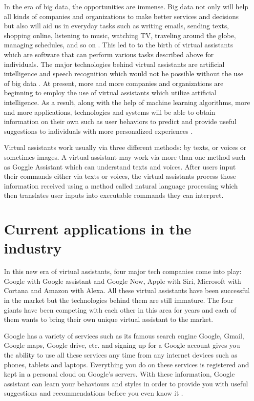 In the era of big data, the opportunities are immense. Big data not only will help all kinds of companies and organizations to make better services and decisions but also will aid us in everyday tasks such as writing emails, sending texts, shopping online, listening to music, watching TV, traveling around the globe, managing schedules, and so on \cite{Tal2015internet}. This led to to the birth of virtual assistants which are software that can perform various tasks described above for individuals. The major technologies behind virtual assistants are artificial intelligence and speech recognition which would not be possible without the use of big data \cite{Baron2017assistants}. At present, more and more companies and organizations are beginning to employ the use of virtual assistants which utilize artificial intelligence. As a result, along with the help of machine learning algorithms, more and more applications, technologies and systems will be able to obtain information on their own such as user behaviors to predict and provide useful suggestions to individuals with more personalized experiences \cite{Hard2014applications}.

Virtual assistants work usually via three different methods: by texts, or voices or sometimes images. A virtual assistant may work via more than one method such as Goggle Assistant which can understand texts and voices. After users input their commands either via texts or voices, the virtual assistants process those information received using a method called natural language processing which then translates user inputs into executable commands they can interpret. 

\section{Current applications in the industry}

In this new era of virtual assistants, four major tech companies come into play: Google with Google assistant and Google Now, Apple with Siri, Microsoft with Cortana and Amazon with Alexa. All these virtual assistants have been successful in the market but the technologies behind them are still immature. The four giants have been competing with each other in this area for years and each of them wants to bring their own unique virtual assistant to the market. 

Google has a variety of services such as its famous search engine Google, Gmail, Google maps, Google drive, etc. and signing up for a Google account gives you the ability to use all these services any time from any internet devices such as phones, tablets and laptops. Everything you do on these services is registered and kept in a personal cloud on Google's servers. With these information, Google assistant can learn your behaviours and styles in order to provide you with useful suggestions and recommendations before you even know it \cite{Tal2015internet}.


